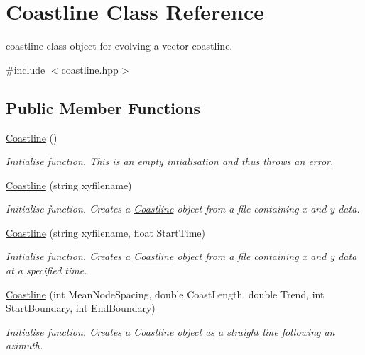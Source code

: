 \hypertarget{classCoastline}{\section{Coastline Class Reference}
\label{classCoastline}
}


coastline class object for evolving a vector coastline.  




{\ttfamily \#include $<$coastline.\-hpp$>$}

\subsection*{Public Member Functions}
\begin{DoxyCompactItemize}
\item 
\hyperlink{classCoastline_ab936a554bb354b7311555ed83348f608}{Coastline} ()
\begin{DoxyCompactList}\small\item\em Initialise function. This is an empty intialisation and thus throws an error. \end{DoxyCompactList}\item 
\hyperlink{classCoastline_a64f685e01116a4e79055a07632359221}{Coastline} (string xyfilename)
\begin{DoxyCompactList}\small\item\em Initialise function. Creates a \hyperlink{classCoastline}{Coastline} object from a file containing x and y data. \end{DoxyCompactList}\item 
\hyperlink{classCoastline_a4c1f09b298f867ecc1a7616ae1e7a6a5}{Coastline} (string xyfilename, float Start\-Time)
\begin{DoxyCompactList}\small\item\em Initialise function. Creates a \hyperlink{classCoastline}{Coastline} object from a file containing x and y data at a specified time. \end{DoxyCompactList}\item 
\hyperlink{classCoastline_a242aa493f86e0b76c5866caf2e3dd2bf}{Coastline} (int Mean\-Node\-Spacing, double Coast\-Length, double Trend, int Start\-Boundary, int End\-Boundary)
\begin{DoxyCompactList}\small\item\em Initialise function. Creates a \hyperlink{classCoastline}{Coastline} object as a straight line following an azimuth. \end{DoxyCompactList}\item 

\end{DoxyCompactItemize}
